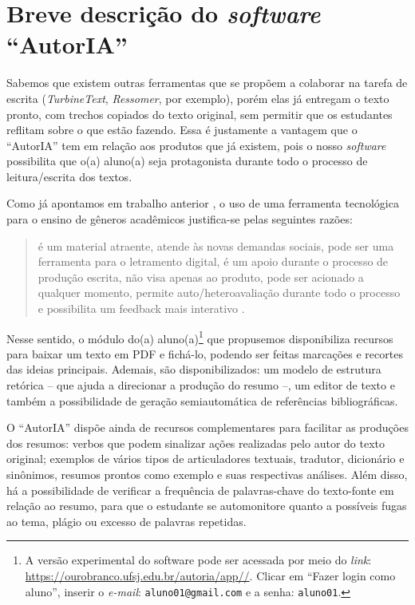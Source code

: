 \documentclass[portuguese]{textolivre}
\begin{document}
\section{Breve descrição do \textit{software} “AutorIA”}\label{sec-fmt-manuscrito}
Sabemos que existem outras ferramentas que se propõem a colaborar na tarefa de escrita (\textit{TurbineText}, \textit{Ressomer}, por exemplo), porém elas já entregam o texto pronto, com trechos copiados do texto original, sem permitir que os estudantes reflitam sobre o que estão fazendo. Essa é justamente a vantagem que o “AutorIA” tem em relação aos produtos que já existem, pois o nosso \textit{software} possibilita que o(a) aluno(a) seja protagonista durante todo o processo de leitura/escrita dos textos.

Como já apontamos em trabalho anterior \cite{caetanooliveira2021}, o uso de uma ferramenta tecnológica para o ensino de gêneros acadêmicos justifica-se pelas seguintes razões:

\begin{quote}
    é um material atraente, atende às novas demandas sociais, pode ser uma ferramenta para o letramento digital, é um apoio durante o processo de produção escrita, não visa apenas ao produto, pode ser acionado a qualquer momento, permite auto/heteroavaliação durante todo o processo e possibilita um feedback mais interativo \cite[p.~1410]{caetanooliveira2021}.
\end{quote}

Nesse sentido, o módulo do(a) aluno(a)\footnote{A versão experimental do software pode ser acessada por meio do \textit{link}: \url{https://ourobranco.ufsj.edu.br/autoria/app//}. Clicar em “Fazer login como aluno”, inserir o \textit{e-mail}: \texttt{aluno01@gmail.com} e a senha: \texttt{aluno01}.} que propusemos disponibiliza recursos para baixar um texto em PDF e fichá-lo, podendo ser feitas marcações e recortes das ideias principais. Ademais, são disponibilizados: um modelo de estrutura retórica -- que ajuda a direcionar a produção do resumo --, um editor de texto e também a possibilidade de geração semiautomática de referências bibliográficas.

O “AutorIA” dispõe ainda de recursos complementares para facilitar as produções dos resumos: verbos que podem sinalizar ações realizadas pelo autor do texto original; exemplos de vários tipos de articuladores textuais, tradutor, dicionário e sinônimos, resumos prontos como exemplo e suas respectivas análises. Além disso, há a possibilidade de verificar a frequência de palavras-chave do texto-fonte em relação ao resumo, para que o estudante se automonitore quanto a possíveis fugas ao tema, plágio ou excesso de palavras repetidas.
\end{document}
